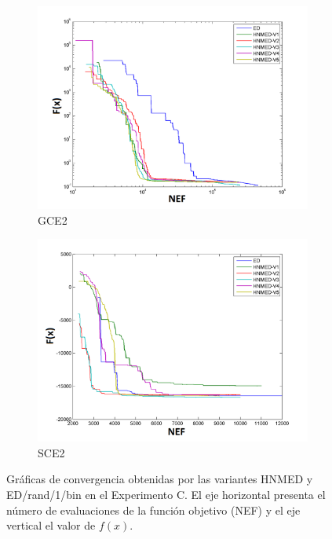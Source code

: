 \begin{figure}
\begin{subfigure}[b]{0.49\linewidth}
		\includegraphics[width=\linewidth]{Figures/C-Grafica_Convergencia_Problema_5}
		\caption{GCE2} \label{fig:G2} 
	\end{subfigure}
	\begin{subfigure}[b]{0.49\linewidth}
		\includegraphics[width=\linewidth]{Figures/C-Grafica_Convergencia_Problema_6}
		\caption{SCE2} \label{fig:S1} 
	\end{subfigure}
	\caption[Gráficas de convergencia obtenidas por las variantes HNMED y ED/rand/1/bin en el Experimento C.]{Gráficas de convergencia obtenidas por las variantes HNMED y ED/rand/1/bin en el Experimento C. El eje horizontal presenta el número de evaluaciones de la función objetivo (NEF) y el eje vertical el valor de  $f(x)$.} \label{fig: Gráficas de convergencia para las variantes HNMED y ED/rand/1/bin para el Experimento C} 
	
\end{figure}
